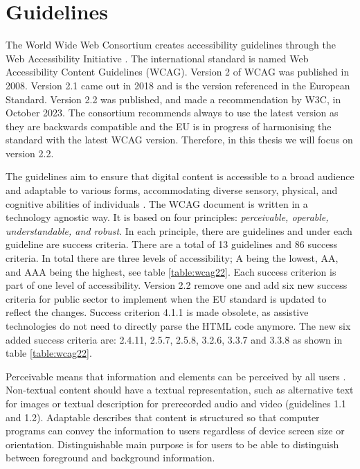 \section{Guidelines}

The World Wide Web Consortium creates accessibility guidelines through the Web Accessibility Initiative \citep{wcagoverview}. The international standard is named Web Accessibility Content Guidelines (WCAG). Version 2 of WCAG was published in 2008. Version 2.1 came out in 2018 and is the version referenced in the European Standard. Version 2.2 was published, and made a recommendation by W3C, in October 2023. The consortium recommends always to use the latest version as they are backwards compatible and the EU is in progress of harmonising the standard with the latest WCAG version. Therefore, in this thesis we will focus on version 2.2.

The guidelines aim to ensure that digital content is accessible to a broad audience and adaptable to various forms, accommodating diverse sensory, physical, and cognitive abilities of individuals \citep{wcag22}. The WCAG document is written in a technology agnostic way. It is based on four principles: \textit{perceivable, operable, understandable, and robust}. In each principle, there are guidelines and under each guideline are success criteria. There are a total of 13 guidelines and 86 success criteria. In total there are three levels of accessibility; A being the lowest, AA, and AAA being the highest, see table \ref{table:wcag22}. Each success criterion is part of one level of accessibility. Version 2.2 remove one and add six new success criteria for public sector to implement when the EU standard is updated to reflect the changes. Success criterion 4.1.1 is made obsolete, as assistive technologies do not need to directly parse the HTML code anymore. The new six added success criteria are: 2.4.11, 2.5.7, 2.5.8, 3.2.6, 3.3.7 and 3.3.8 as shown in table \ref{table:wcag22}. 



Perceivable means that information and elements can be perceived by all users \citep{wcag22}. Non-textual content should have a textual representation, such as alternative text for images or textual description for prerecorded audio and video (guidelines 1.1 and 1.2). Adaptable describes that content is structured so that computer programs can convey the information to users regardless of device screen size or orientation. Distinguishable main purpose is for users to be able to distinguish between foreground and background information.

